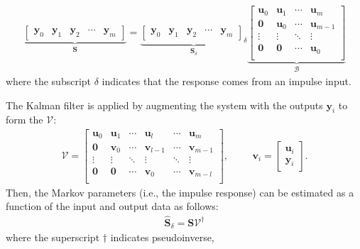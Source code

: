\documentclass[letterpaper,10pt,english]{sphinxmanual}
\begin{document}
\begin{equation*}
\begin{split}\underbrace{\begin{bmatrix} \mathbf{y}_{0} & \mathbf{y}_{1} & \mathbf{y}_{2} & \cdots & \mathbf{y}_{m} \end{bmatrix}}_{\mathbf{S}}
=
\underbrace{\begin{bmatrix} \mathbf{y}_{0} & \mathbf{y}_{1} & \mathbf{y}_{2} & \cdots & \mathbf{y}_{m} \end{bmatrix}_{\delta}}_{\mathbf{S}_{\delta}}
\underbrace{\begin{bmatrix}
    \mathbf{u}_{0} & \mathbf{u}_{1} & \cdots & \mathbf{u}_{m}   \\
    \mathbf{0}     & \mathbf{u}_{0} & \cdots & \mathbf{u}_{m-1} \\
    \vdots         & \vdots         & \ddots & \vdots           \\
    \mathbf{0}     & \mathbf{0}     & \cdots & \mathbf{u}_{0}   \\
\end{bmatrix}}_{\mathscr{B}}\end{split}
\end{equation*}
\sphinxAtStartPar
where the subscript \(\delta\) indicates that the response comes
from an impulse input.

\sphinxAtStartPar
The Kalman filter is applied by augmenting the system with the outputs
\(\mathbf{y}_{i}\) to form the 
\(\mathscr{V}\):
\begin{equation*}
\begin{split}\mathscr{V}
=
\begin{bmatrix}
    \mathbf{u}_{0} & \mathbf{u}_{1} & \cdots & \mathbf{u}_{l}   & \cdots & \mathbf{u}_{m}   \\
    \mathbf{0}     & \mathbf{v}_{0} & \cdots & \mathbf{v}_{l-1} & \cdots & \mathbf{v}_{m-1} \\
    \vdots         & \vdots         & \ddots & \vdots           & \ddots & \vdots           \\
    \mathbf{0}     & \mathbf{0}     & \cdots & \mathbf{v}_{0}   & \cdots & \mathbf{v}_{m-l} \\
\end{bmatrix}, \hspace{1cm}
\mathbf{v}_{i} = \begin{bmatrix} \mathbf{u}_{i} \\ \mathbf{y}_{i} \end{bmatrix}.\end{split}
\end{equation*}
\sphinxAtStartPar
Then, the Markov parameters (i.e., the impulse response) can be
estimated as a function of the input and output data as follows:
\begin{equation*}
\begin{split}\hat{\mathbf{S}}_\delta = \mathbf{S}\mathscr{V}^{\dagger}\end{split}
\end{equation*}
\sphinxAtStartPar
where the superscript \(\dagger\) indicates pseudo\sphinxhyphen{}inverse,
\end{document}

